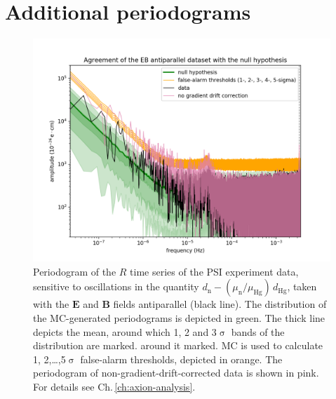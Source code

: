\chapter{Additional periodograms}
\label{ch:alp_appendix}

\begin{figure}[h!]
  \centering
  \includegraphics[width=\linewidth]{gfx/axions/AP_detection_and_no_GDC.png}
  \caption{Periodogram of the $R$ time series of the PSI experiment data, sensitive to oscillations in the quantity $d_\mathrm{n} - \left( \mu_\mathrm{n} / \mu_\mathrm{Hg} \right) \, d_\mathrm{Hg}$, taken with the $\mathbf{E}$ and $\mathbf{B}$ fields antiparallel (black line).
  The distribution of the MC-generated periodograms is depicted in green. The thick line depicts the mean, around which 1, 2 and 3$\upsigma$ bands of the distribution are marked. around it marked. MC is used to calculate 1, 2,…,5$\upsigma$ false-alarm thresholds, depicted in orange.
  The periodogram of non-gradient-drift-corrected data is shown in pink. For details see Ch.\,\ref{ch:axion-analysis}.}\label{fig:app_AP_periodogram}
\end{figure}

